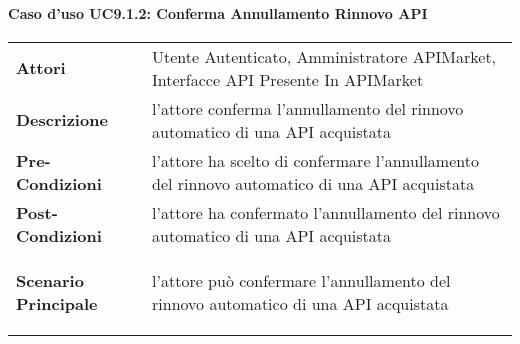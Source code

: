 \newpage
\paragraph{Caso d'uso UC9.1.2: Conferma Annullamento Rinnovo API}
\label{UC9.1.2}

\renewcommand*{\arraystretch}{1.6}
\begin{longtable}{ l | p{11cm}}
	\hline
	\rowcolor{Gray}
	\multicolumn{2}{c}{UC9.1.2: Conferma Annullamento Rinnovo API} \\
	\hline
	\textbf{Attori} &Utente Autenticato, Amministratore APIMarket, Interfacce API Presente In APIMarket \\
	\textbf{Descrizione} & l'attore conferma l'annullamento del rinnovo automatico di una API acquistata \\
	\textbf{Pre-Condizioni} & l'attore ha scelto di confermare l'annullamento del rinnovo automatico di una API acquistata\\
	\textbf{Post-Condizioni}& l'attore ha confermato l'annullamento del rinnovo automatico di una API acquistata\\
	\textbf{Scenario Principale} & \begin{enumerate*}[label=(\arabic*.),itemjoin={\newline}]
		\item l'attore può confermare l'annullamento del rinnovo automatico di una API acquistata
	\end{enumerate*}\\
\end{longtable}
